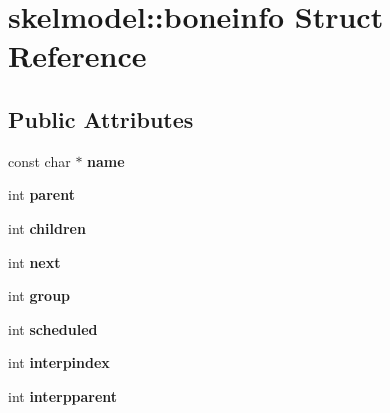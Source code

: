 \hypertarget{structskelmodel_1_1boneinfo}{}\section{skelmodel\+:\+:boneinfo Struct Reference}
\label{structskelmodel_1_1boneinfo}
\subsection*{Public Attributes}
\begin{DoxyCompactItemize}
\item 
\mbox{\label{structskelmodel_1_1boneinfo_a7c79f04ae176def99a9ef8e8c145d63b}} 
const char $\ast$ {\bfseries name}
\item 
\mbox{\label{structskelmodel_1_1boneinfo_ac2d292bfc7c6d1bb52b782e79b5a6faa}} 
int {\bfseries parent}
\item 
\mbox{\label{structskelmodel_1_1boneinfo_a273d1f713a813df4d6b93b0f3ec16a30}} 
int {\bfseries children}
\item 
\mbox{\label{structskelmodel_1_1boneinfo_ad0bfa69ecb73d26d08a3b156ad4c2ffd}} 
int {\bfseries next}
\item 
\mbox{\label{structskelmodel_1_1boneinfo_ad414ec14e5cf49f570ec83f920ef1987}} 
int {\bfseries group}
\item 
\mbox{\label{structskelmodel_1_1boneinfo_ac4a1ceb727189c5faaec738379af6075}} 
int {\bfseries scheduled}
\item 
\mbox{\label{structskelmodel_1_1boneinfo_ad5b8e5d5e8a1f46c2cf41aa7fe26210d}} 
int {\bfseries interpindex}
\item 
\mbox{\label{structskelmodel_1_1boneinfo_a5c42d00972cde4174f35d5bf9335a8ff}} 
int {\bfseries interpparent}
\item 
\mbox{\label{structskelmodel_1_1boneinfo_a7d6f075388ab9b73a2fc37ec90875703}} 

\end{DoxyCompactItemize}
